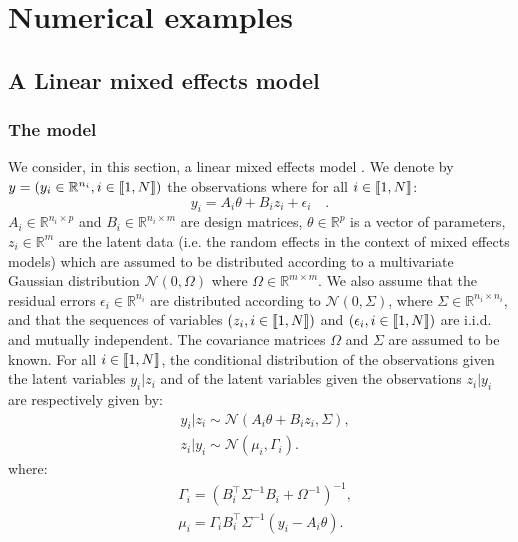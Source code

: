 \section{Numerical examples}\label{sec:numerical}
\subsection{A Linear mixed effects model}
\subsubsection{The model}
We consider, in this section, a linear mixed effects model \citep{lavielle2014Mixed}.
We denote by $y = (y_i \in \mathbb{R}^{n_i}, i \in \llbracket1,N\rrbracket)$ the observations where for all $i \in \llbracket1,N\rrbracket$:
\begin{equation}
y_i = A_i\theta + B_iz_i + \epsilon_i \quad.
\end{equation}
$A_i \in \mathbb{R}^{n_i \times p}$ and $B_i \in \mathbb{R}^{n_i \times m}$ are design matrices, $\theta \in \mathbb{R}^{p}$ is a vector of parameters, $z_i \in \mathbb{R}^{m}$ are the latent data (i.e. the random effects in the context of mixed effects models) which are assumed to be distributed according to a multivariate Gaussian distribution $\mathcal{N}(0,\Omega)$ where $\Omega \in \mathbb{R}^{m \times m}$. We also assume that the residual errors $\epsilon_i \in \mathbb{R}^{n_i}$ are distributed according to $\mathcal{N}(0,\Sigma)$, where $\Sigma \in \mathbb{R}^{n_i \times n_i}$, and that the sequences of variables $(z_i, i \in \llbracket1,N\rrbracket)$ and $(\epsilon_i, i \in \llbracket1,N\rrbracket)$ are i.i.d. and mutually independent. The covariance matrices $\Omega$ and $\Sigma$ are assumed to be known. For all $i \in \llbracket1,N\rrbracket$, the conditional distribution of the observations given the latent variables $y_i|z_i$ and of the latent variables given the observations $z_i|y_i$ are respectively given by:
\begin{align}
& y_i|z_i \sim \mathcal{N}(A_i\theta + B_iz_i,\Sigma),\\
& z_i|y_i \sim \mathcal{N}(\mu_i, \Gamma_i).
\end{align}
where:
\begin{align}\label{posteriormean}
&\Gamma_i =  (B_i^\top \Sigma^{-1} B_i + \Omega^{-1})^{-1},\\
&\mu_i = \Gamma_i B_i^\top\Sigma^{-1} (y_i - A_i\theta).
\end{align}
